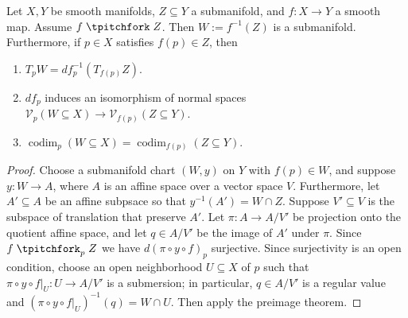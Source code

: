 \begin{theorem}
    Let $X,Y$ be smooth manifolds, $Z \subseteq Y$ a submanifold, and $f \colon X \to Y$ a smooth map. Assume $f \transv Z$. Then $W:= f^{-1}(Z)$ is a submanifold. Furthermore, if $p \in X$ satisfies $f(p) \in Z$, then
    \begin{enumerate}[label=(\arabic*)]
        \setlength\itemsep{-.2em}
    \item $T_p W=df_p^{-1}\left( T_{f(p)}Z \right) $.
    \item $df_p$ induces an isomorphism of normal spaces $\mathcal{V}_p(W \subseteq X) \to \mathcal{V} _{f(p)}(Z \subseteq Y) $.
    \item $\operatorname{codim}_p(W \subseteq X)=\operatorname{codim}_{f(p)}(Z \subseteq Y)$.
    \end{enumerate}
\end{theorem}
\begin{proof}
    Choose a submanifold chart $(W,y)$ on $Y$ with $f(p) \in W$, and suppose $y \colon W \to A$, where $A$ is an affine space over a vector space $V$. Furthermore, let $A' \subseteq A$ be an affine subpsace so that $y^{-1}(A')=W \cap Z$. Suppose $V' \subseteq V$ is the subspace of translation that preserve $A'$. Let $\pi \colon A \to A /V'$ be projection onto the quotient affine space, and let $q \in A /V'$ be the image of $A'$ under $\pi$. Since $f\transv_p Z$ we have $d(\pi \circ y\circ f)_p$ surjective. Since surjectivity is an open condition, choose an open neighborhood $U \subseteq X$ of $p$ such that $\pi \circ y\circ f|_U \colon U \to A /V'$ is a submersion; in particular, $q \in A /V'$ is a regular value and $(\pi \circ y\circ f|_U)^{-1}(q)=W \cap U$. Then apply the preimage theorem.
\end{proof}
